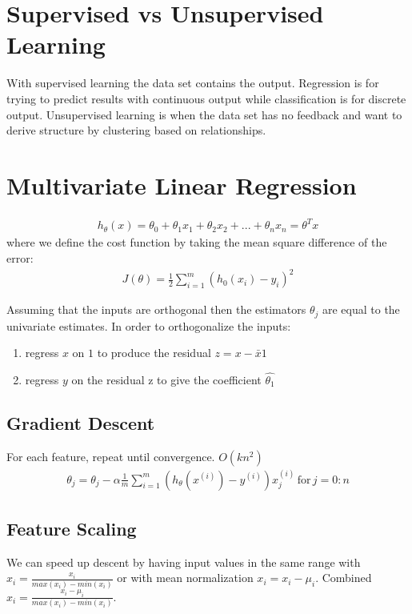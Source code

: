 \documentclass[12pt]{article}
\begin{document}
	\maketitle
	
\section{Supervised vs Unsupervised Learning}
With supervised learning the data set contains the output. Regression is for trying to predict results with continuous output while classification is for discrete output. Unsupervised learning is when the data set has no feedback and want to derive structure by clustering based on relationships.

\section{Multivariate Linear Regression}
\begin{align*}
	h_\theta (x) = \theta_0 + \theta_1 x_1 + \theta_2 x_2 + ... + \theta_nx_n = \theta^Tx
\end{align*}
where we define the cost function by taking the mean square difference of the error:
\begin{align*}
	J(\theta)=\frac{1}{2}\sum_{i=1}^{m}(h_0(x_i)-y_i)^2
\end{align*}

Assuming that the inputs are orthogonal then the estimators $\theta_j$ are equal to the univariate estimates. In order to orthogonalize the inputs:

\begin{enumerate}
    \item regress $x$ on $1$ to produce the residual $z=x-\bar{x}1$ 
    \item regress $y$ on the residual z to give the coefficient $\hat{\theta_1}$
\end{enumerate}


\subsection{Gradient Descent}
For each feature, repeat until convergence. $O(kn^2)$
\begin{align*}
	\theta_j = \theta_j - \alpha\frac{1}{m}\sum_{i=1}^{m}(h_\theta (x^{(i)})-y^{(i)})x_j^{(i)}\,\text{for}\, j=0:n
\end{align*}

\subsection{Feature Scaling}
We can speed up descent by having input values in the same range with $x_i = \frac{x_i}{max(x_i)-min(x_i)}$ or with mean normalization $x_i = x_i - \mu_i$.  Combined $x_i = \frac{x_i - \mu_i}{max(x_i)-min(x_i)}$.
\end{document}
